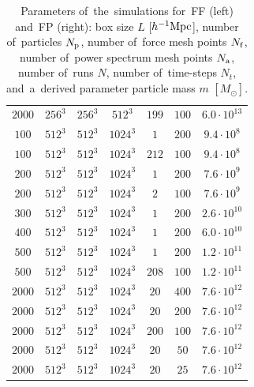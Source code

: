 \begin{landscape}
\begin{table}
{\begin{tabular}{ ccccccc }
    $2000$ & $256^3$ & $256^3$ & $512^3$ & $199$ & $100$ & $6.0\cdot10^{13}$\\
    $100$ & $512^3$ & $512^3$ & $1024^3$ & $1$ & $200$ & $9.4\cdot10^{8}$\\
    $100$ & $512^3$ & $512^3$ & $1024^3$ & $212$ & $100$ & $9.4\cdot10^{8}$\\
    $200$ & $512^3$ & $512^3$ & $1024^3$ & $1$ & $200$ & $7.6\cdot10^{9}$\\
    $200$ & $512^3$ & $512^3$ & $1024^3$ & $2$ & $100$ & $7.6\cdot10^{9}$\\
    $300$ & $512^3$ & $512^3$ & $1024^3$ & $1$ & $200$ & $2.6\cdot10^{10}$\\
    $400$ & $512^3$ & $512^3$ & $1024^3$ & $1$ & $200$ & $6.0\cdot10^{10}$\\
    $500$ & $512^3$ & $512^3$ & $1024^3$ & $1$ & $200$ & $1.2\cdot10^{11}$\\
    $500$ & $512^3$ & $512^3$ & $1024^3$ & $208$ & $100$ & $1.2\cdot10^{11}$\\
    $2000$ & $512^3$ & $512^3$ & $1024^3$ & $20$ & $400$ & $7.6\cdot10^{12}$\\
    $2000$ & $512^3$ & $512^3$ & $1024^3$ & $20$ & $200$ & $7.6\cdot10^{12}$\\
    $2000$ & $512^3$ & $512^3$ & $1024^3$ & $200$ & $100$ & $7.6\cdot10^{12}$\\
    $2000$ & $512^3$ & $512^3$ & $1024^3$ & $20$ & $50$ & $7.6\cdot10^{12}$\\
    $2000$ & $512^3$ & $512^3$ & $1024^3$ & $20$ & $25$ & $7.6\cdot10^{12}$\\
    \hline
    \end{tabular}
    }
    \caption{Parameters of~the~simulations for~FF (left) and~FP (right): box size $L$ [$h^{-1}\text{Mpc}$], number of~particles $N_{\rm p}$, number of~force mesh points $N_{\rm f}$, number of~power spectrum mesh points $N_{\rm a}$, number of~runs $N$, number of~time-steps $N_t$, and~a~derived parameter particle mass $m$ $[M_\odot]$.}
    \label{tab:sim_param_FF_FP}
    \end{table}
    

\end{landscape}
